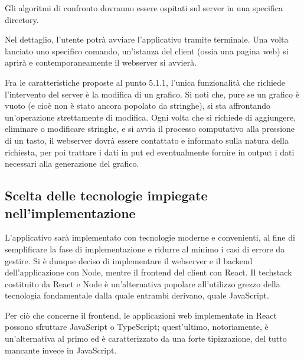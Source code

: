         \vspace{3mm}
        
        Gli algoritmi di confronto dovranno essere ospitati sul server in una specifica directory. 
        
        \vspace{3mm}
        
        Nel dettaglio, l'utente potrà avviare l'applicativo tramite terminale. Una volta lanciato uno specifico comando, un'istanza del client (ossia una pagina web) si aprirà e contemporaneamente il webserver si avvierà.
        
        \vspace{3mm}
        
        Fra le caratteristiche proposte al punto 5.1.1, l'unica funzionalità che richiede l'intervento del server è la modifica di un grafico. Si noti che, pure se un grafico è vuoto (e cioè non è stato ancora popolato da stringhe), si sta affrontando un'operazione strettamente di modifica. Ogni volta che si richiede di aggiungere, eliminare o modificare stringhe, e si avvia il processo computativo alla pressione di un tasto, il webserver dovrà essere contattato e informato sulla natura della richiesta, per poi trattare i dati in put ed eventualmente fornire in output i dati necessari alla generazione del grafico.
    
    \subsection{Scelta delle tecnologie impiegate nell'implementazione}
    
        L'applicativo sarà implementato con tecnologie moderne e convenienti, al fine di semplificare la fase di implementazione e ridurre al minimo i casi di errore da gestire. Si è dunque deciso di implementare il webserver e il backend dell'applicazione con Node, mentre il frontend del client con React. Il techstack costituito da React e Node è un'alternativa popolare all'utilizzo grezzo della tecnologia fondamentale dalla quale entrambi derivano, quale JavaScript. 
        
        \vspace{3mm}
        
        Per ciò che concerne il frontend, le applicazioni web implementate in React possono sfruttare JavaScript o TypeScript; quest'ultimo, notoriamente, è un'alternativa al primo ed è caratterizzato da una forte tipizzazione, del tutto mancante invece in JavaScript. 
        
